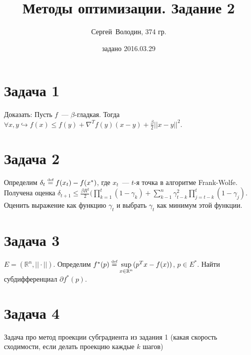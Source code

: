 \documentclass[a4paper]{article}
\title{Методы оптимизации. Задание 2}
\date{задано 2016.03.29}
\author{Сергей~Володин, 374 гр.}
\def\eqdef{\overset{\mbox{\tiny def}}{=}}
\begin{document}
\maketitle
\section*{Задача 1}
Доказать: Пусть $f$~--- $\beta$-гладкая. Тогда $\forall x,y \hookrightarrow f(x)\leqslant f(y)+\nabla^Tf(y)(x-y)+\frac{\beta}{2}||x-y||^2$.
\section*{Задача 2}
Определим $\delta_t\eqdef f(x_t)-f(x^*)$, где $x_t$~--- $t$-я точка в алгоритме Frank-Wolfe. Получена оценка $\delta_{t+1}\leqslant \frac{\beta R^2}{2}(\prod\limits_{k=1}^t(1-\gamma_k)+\sum\limits_{k-1}^n\gamma^2_{t-k}\prod\limits_{j=t-k}^t(1-\gamma_j)$. Оценить выражение как функцию $\gamma_t$ и выбрать $\gamma_t$ как минимум этой функции.
\section*{Задача 3}
$E=(\mathbb{R}^n,||\cdot||)$. Определим $f^*(p)\eqdef\sup\limits_{x\in\mathbb{R}^n}(p^Tx-f(x))$, $p\in E^*$. Найти субдифференциал $\partial f^*(p)$.
\section*{Задача 4}
Задача про метод проекции субградиента из задания 1 (какая скорость сходимости, если делать проекцию каждые $k$ шагов)
\end{document}
